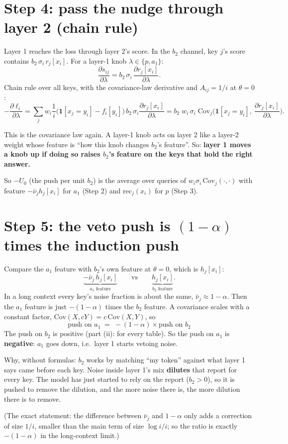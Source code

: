 \documentclass[11pt]{article}
\newcommand{\1}{\mathbf{1}}
\begin{document}
\section{Step 4: pass the nudge through layer 2 (chain rule)}
Layer 1 reaches the loss through layer 2's score. In the $b_2$ channel, key $j$'s score contains
$b_2\,\sigma_i\,r_j[x_i]$. For a layer-1 knob $\lambda\in\{p,a_1\}$:
\[
\frac{\partial s_{ij}}{\partial\lambda}=b_2\,\sigma_i\,\frac{\partial r_j[x_i]}{\partial\lambda}.
\]
Chain rule over all keys, with the covariance-law derivative and $A_{ij}=1/i$ at $\theta=0$:
\[
-\frac{\partial\ell_i}{\partial\lambda}
=\sum_jw_i\frac1i\big(\1[x_j=y_i]-f_i[y_i]\big)\,b_2\,\sigma_i\frac{\partial r_j[x_i]}{\partial\lambda}
= b_2\;w_i\,\sigma_i\;\mathrm{Cov}_j\!\Big(\1[x_j=y_i],\ \frac{\partial r_j[x_i]}{\partial\lambda}\Big).
\]
\begin{idea}
This is the covariance law again. A layer-1 knob acts on layer 2 like a layer-2 weight whose feature is
``how this knob changes $b_2$'s feature''. So: \textbf{layer 1 moves a knob up if doing so raises $b_2$'s feature on
the keys that hold the right answer.}
\end{idea}
So $-U_0$ (the push per unit $b_2$) is the average over queries of $w_i\sigma_i\,\mathrm{Cov}_j(\cdot,\cdot)$ with feature
$-\bar\nu_jh_j[x_i]$ for $a_1$ (Step 2) and $\mathrm{rec}_j(x_i)$ for $p$ (Step 3).

\section{Step 5: the veto push is $(1-\alpha)$ times the induction push}
Compare the $a_1$ feature with $b_2$'s own feature at $\theta=0$, which is $h_j[x_i]$:
\[
\underbrace{-\bar\nu_j\,h_j[x_i]}_{a_1\text{ feature}}\qquad\text{vs}\qquad\underbrace{h_j[x_i]}_{b_2\text{ feature}}.
\]
In a long context every key's noise fraction is about the same, $\bar\nu_j\approx1-\alpha$. Then the $a_1$ feature is
just $-(1-\alpha)$ times the $b_2$ feature. A covariance scales with a constant factor,
$\mathrm{Cov}(X,cY)=c\,\mathrm{Cov}(X,Y)$, so
\[
\boxed{\ \text{push on }a_1\;=\;-(1-\alpha)\times\text{push on }b_2\ }
\]
The push on $b_2$ is positive (part (ii): for every table). So the push on $a_1$ is \textbf{negative}:
$a_1$ goes down, i.e.\ layer 1 starts vetoing noise.
\begin{idea}
Why, without formulas: $b_2$ works by matching ``my token'' against what layer 1 says came before each key. Noise
inside layer 1's mix \textbf{dilutes} that report for every key. The model has just started to rely on the report
($b_2>0$), so it is pushed to remove the dilution, and the more noise there is, the more dilution there is to
remove.
\end{idea}
(The exact statement: the difference between $\bar\nu_j$ and $1-\alpha$ only adds a correction of size $1/i$, smaller than
the main term of size $\log i/i$; so the ratio is exactly $-(1-\alpha)$ in the long-context limit.)
\end{document}

